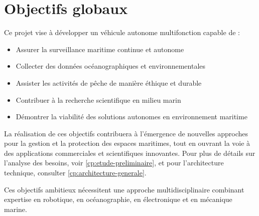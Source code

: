 {\section{Objectifs globaux}
Ce projet vise à développer un véhicule autonome multifonction capable de :
\begin{itemize}
    \setlength{\itemsep}{.375em}
    \item Assurer la surveillance maritime continue et autonome
    \item Collecter des données océanographiques et environnementales
    \item Assister les activités de pêche de manière éthique et durable
    \item Contribuer à la recherche scientifique en milieu marin
    \item Démontrer la viabilité des solutions autonomes en environnement maritime
\end{itemize}

La réalisation de ces objectifs contribuera à l'émergence de nouvelles approches pour la gestion et la protection des espaces maritimes, tout en ouvrant la voie à des applications commerciales et scientifiques innovantes. Pour plus de détails sur l'analyse des besoins, voir \autoref{cp:etude-preliminaire}, et pour l'architecture technique, consulter \autoref{cp:architecture-generale}.

\begin{block}[tip]
Ces objectifs ambitieux nécessitent une approche multidisciplinaire combinant expertise en robotique, en océanographie, en électronique et en mécanique marine.
\end{block}

} 